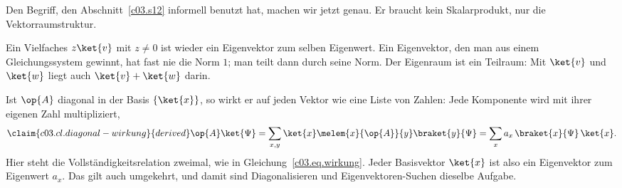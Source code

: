 Den Begriff, den Abschnitt~\ref{c03.s12} informell benutzt hat, machen wir jetzt genau. Er
braucht kein Skalarprodukt, nur die Vektorraumstruktur.


Ein Vielfaches $z\ket{v}$ mit $z \neq 0$ ist wieder ein Eigenvektor zum selben Eigenwert. Ein
Eigenvektor, den man aus einem Gleichungssystem gewinnt, hat fast nie die Norm $1$; man teilt
dann durch seine Norm. Der Eigenraum ist ein Teilraum: Mit $\ket{v}$ und $\ket{w}$ liegt auch
$\ket{v} + \ket{w}$ darin.


Ist $\op{A}$ diagonal in der Basis $\{\ket{x}\}$, so wirkt er auf jeden Vektor wie eine Liste von
Zahlen: Jede Komponente wird mit ihrer eigenen Zahl multipliziert,
\begin{equation}\label{c03.eq.diagonal-wirkung}\claim{c03.cl.diagonal-wirkung}{derived}
  \op{A}\ket{\Psi}
  = \sum_{x,y} \ket{x}\melem{x}{\op{A}}{y}\braket{y}{\Psi}
  = \sum_{x} a_x\, \braket{x}{\Psi}\, \ket{x} .
\end{equation}
Hier steht die Vollständigkeitsrelation zweimal, wie in Gleichung~\eqref{c03.eq.wirkung}. Jeder
Basisvektor $\ket{x}$ ist also ein Eigenvektor zum Eigenwert $a_x$. Das gilt auch umgekehrt, und
damit sind Diagonalisieren und Eigenvektoren-Suchen dieselbe Aufgabe.

